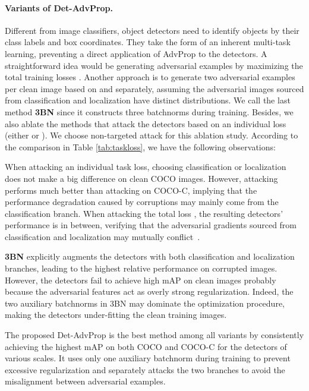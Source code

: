 \documentclass[final]{cvpr}
\begin{document}
\paragraph{Variants of Det-AdvProp.}
Different from image classifiers, object detectors need to identify objects by their class labels and box coordinates. They take the form of an inherent multi-task learning, preventing a direct application of AdvProp to the detectors. A straightforward idea would be generating adversarial examples by maximizing the total training losses .
Another approach is to generate two adversarial examples per clean image based on  and  separately, assuming the adversarial images sourced from classification and localization have distinct distributions. 
We call the last method \textbf{3BN} since it constructs three batchnorms during training.
Besides, we also ablate the methods that attack the detectors based on an individual loss (either  or ).
We choose non-targeted attack for this ablation study.
According to the comparison in Table \ref{tab:taskloss}, we have the following observations:

\begin{compactitem}
\vspace{0.2em}
    \item When attacking an individual task loss, choosing classification or localization does not make a big difference on clean COCO images. 
    However, attacking  performs much better than attacking   on COCO-C, implying that the performance degradation caused by corruptions may mainly come from the classification branch. 
When attacking the total loss , the resulting detectors' performance is in between, verifying that the adversarial gradients sourced from classification and localization may mutually conflict~\cite{zhang2019towards}.
    \vspace{0.2em}
    \item \textbf{3BN} explicitly augments the detectors with both classification and localization branches, leading to the highest relative performance on corrupted images. However, the detectors fail to achieve high mAP on clean images probably because the adversarial features act as overly strong regularization. Indeed, the two auxiliary batchnorms in 3BN may dominate the optimization procedure, making the detectors under-fitting the clean training images.
    \vspace{0.2em}
    \item The proposed Det-AdvProp is the best method among all variants by consistently achieving the highest mAP on both COCO and COCO-C for the detectors of various scales.
    It uses only one auxiliary batchnorm during training to prevent excessive regularization and separately attacks the two branches to avoid the misalignment between adversarial examples.
\end{compactitem}
\end{document}

